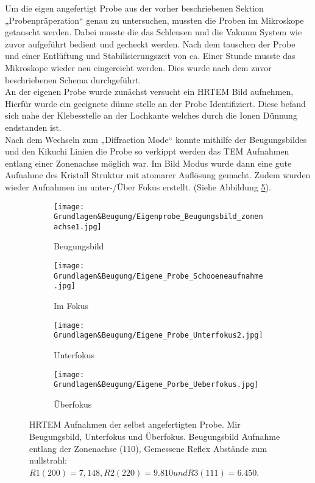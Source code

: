 Um die eigen angefertigt Probe aus der vorher beschriebenen Sektion „Probenpräperation“ genau zu untersuchen, mussten die Proben im Mikroskope getauscht werden. Dabei musste die das Schleusen und die Vakuum System wie zuvor aufgeführt bedient und gecheckt werden. Nach dem tauschen der Probe und einer Entlüftung und Stabilisierungszeit von ca. Einer Stunde musste das Mikroskope wieder neu eingereicht werden.  Dies wurde nach dem zuvor beschriebenen Schema durchgeführt.\\
An der eigenen Probe wurde zunächst versucht ein HRTEM Bild aufnehmen, Hierfür wurde ein geeignete dünne stelle an der Probe Identifiziert. Diese befand sich nahe der Klebesstelle an der Lochkante welches durch die Ionen Dünnung endstanden ist.\\
Nach dem Wechseln zum „Diffraction Mode“ konnte mithilfe der Beugungsbildes und den Kikuchi Linien die Probe so verkippt werden das TEM Aufnahmen entlang einer Zonenachse möglich war. Im Bild Modus wurde dann eine gute Aufnahme des Kristall Struktur mit atomarer Auflösung gemacht. Zudem wurden wieder Aufnahmen im unter-/Über Fokus erstellt. (Siehe Abbildung \cref{EigeneProbe}).

\begin{figure}
     \centering
     \begin{subfigure}[b]{0.49\textwidth}
         \centering
         \texttt{[image: Grundlagen\&Beugung/Eigenprobe\_Beugungsbild\_zonenachse1.jpg]}
         \caption{Beugungsbild}
         \label{EPBB}
     \end{subfigure}
     \hfill
     \begin{subfigure}[b]{0.49\textwidth}
         \centering
         \texttt{[image: Grundlagen\&Beugung/Eigene\_Probe\_Schooeneaufnahme.jpg]}
         \caption{Im Fokus}
         \label{EPFokus}
     \end{subfigure}
     \hfill
     \begin{subfigure}[b]{0.49\textwidth}
         \centering
         \texttt{[image: Grundlagen\&Beugung/Eigene\_Probe\_Unterfokus2.jpg]}
         \caption{Unterfokus}
         \label{EPUnterfokus}
     \end{subfigure}
     \hfill
     \begin{subfigure}[b]{0.49\textwidth}
         \centering
         \texttt{[image: Grundlagen\&Beugung/Eigene\_Porbe\_Ueberfokus.jpg]}
         \caption{Überfokus}
         \label{SPÜberfokus}
     \end{subfigure}
        \caption{HRTEM Aufnahmen der selbst angefertigten Probe. Mir Beugungsbild, Unterfokus und Überfokus. Beugungsbild Aufnahme entlang der Zonenachse (110), Gemessene Reflex Abstände zum nullstrahl: \(R1(200) = 7,148, R2(220) = 9.810 und R3(111) = 6.450\).}
        \label{EigeneProbe}
\end{figure}


